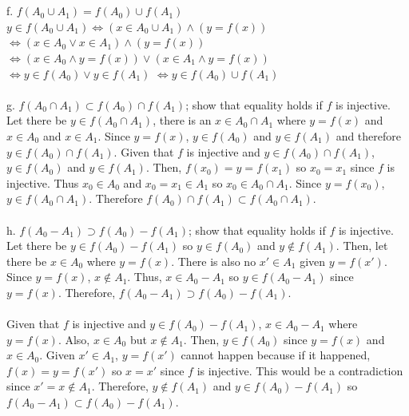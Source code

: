 \documentclass[]{article}
\begin{document}
\begin{enumerate}
    \\\\f. $f(A_0 \cup A_1) = f(A_0) \cup f(A_1)$
    \newline $y \in f(A_0 \cup A_1) \iff (x \in A_0 \cup A_1) \land (y=f(x))$
    \newline $\iff (x \in A_0 \lor x \in A_1) \land (y=f(x))$
    \newline $\iff (x \in A_0 \land y=f(x)) \lor (x \in A_1 \land y=f(x))$
    \newline $\iff y \in f(A_0) \lor y \in f(A_1)$
    \newline $\iff y \in f(A_0) \cup f(A_1)$
    \\\\g. $f(A_0 \cap A_1) \subset f(A_0) \cap f(A_1)$; show that equality holds if $f$ is injective.
    \newline Let there be $y \in f(A_0 \cap A_1)$, there is an $x \in A_0 \cap A_1$ where $y=f(x)$ and $x \in A_0$ and $x \in A_1$. Since $y=f(x)$, $y \in f(A_0)$ and $y \in f(A_1)$ and therefore $y \in f(A_0) \cap f(A_1)$. Given that $f$ is injective and $y \in f(A_0) \cap f(A_1)$, $y \in f(A_0)$ and $y \in f(A_1)$. Then, $f(x_0)=y=f(x_1)$ so $x_0=x_1$ since $f$ is injective. Thus $x_0 \in A_0$ and $x_0=x_1 \in A_1$ so $x_0 \in A_0 \cap A_1$. Since $y=f(x_0)$, $y \in f(A_0 \cap A_1)$. Therefore $f(A_0) \cap f(A_1) \subset f(A_0 \cap A_1)$.
    \\\\ h. $f(A_0-A_1) \supset  f(A_0)-f(A_1)$; show that equality holds if $f$ is injective.
    \newline Let there be $y \in f(A_0)-f(A_1)$ so $y \in f(A_0)$ and $y \notin f(A_1)$. Then, let there be $x \in A_0$ where $y=f(x)$. There is also no $x' \in A_1$ given $y=f(x')$. Since $y=f(x)$, $x \notin A_1$. Thus, $x \in A_0 -A_1$ so $y \in f(A_0-A_1)$ since $y=f(x)$. Therefore, $f(A_0-A_1) \supset f(A_0)-f(A_1)$. \\\\Given that $f$ is injective and $y \in f(A_0) - f(A_1)$, $x \in A_0 -A_1$ where $y=f(x)$. Also, $x \in A_0$ but $x \notin A_1$. Then, $y \in f(A_0)$ since $y=f(x)$ and $x \in A_0$. Given $x' \in A_1$, $y=f(x')$ cannot happen because if it happened, $f(x)=y=f(x')$ so $x=x'$ since $f$ is injective. This would be a contradiction since $x'=x \notin A_1$. Therefore, $y \notin f(A_1)$ and $y \in f(A_0) - f(A_1)$ so $f(A_0-A_1) \subset f(A_0)-f(A_1)$.
    

\end{enumerate}
\end{document}
